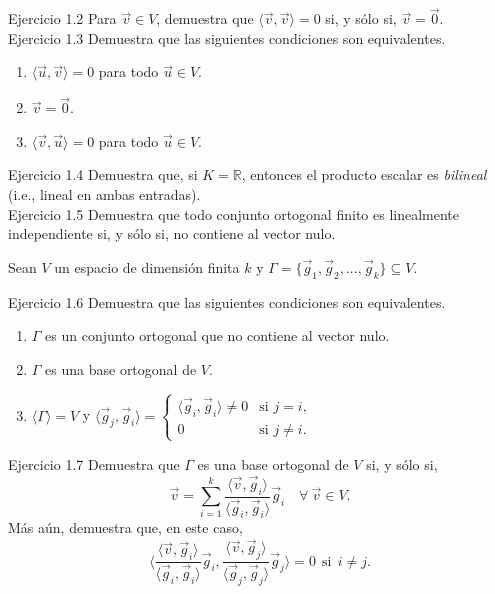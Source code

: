 \documentclass[12pt,dvipsnames]{article}
\numberwithin{equation}{section}
\begin{document}
Ejercicio 1.2 Para $\vec{v}\in V$, demuestra que $\langle \vec{v} , \vec{v} \rangle = 0$ si, y sólo si, $\vec{v}=\vec{0}$. \\

Ejercicio 1.3 Demuestra que las siguientes condiciones son equivalentes. %

\begin{enumerate}[label=(\alph*)]
    \item $\langle \vec{u} , \vec{v} \rangle = 0$ para todo $\vec{u}\in V$.

    \item $\vec{v}=\vec{0}$.

    \item $\langle \vec{v} , \vec{u} \rangle = 0$ para todo $\vec{u}\in V$.
\end{enumerate}

Ejercicio 1.4 Demuestra que, si $K=\mathbb{R}$, entonces el producto escalar es \emph{bilineal} (i.e., lineal en ambas entradas). \\

Ejercicio 1.5 Demuestra que todo conjunto ortogonal finito es linealmente independiente si, y sólo si, no contiene al vector nulo. \\

\begin{center}
Sean $V$ un espacio de dimensión finita $k$ y $\Gamma=\{\vec{g}_1,\vec{g}_2,...,\vec{g}_k\}\subseteq V$.
\end{center}

Ejercicio 1.6 Demuestra que las siguientes condiciones son equivalentes. 

\begin{enumerate}[label=(\alph*)]
    \item $\Gamma$ es un conjunto ortogonal que no contiene al vector nulo.

    \item $\Gamma$ es una base ortogonal de $V$.

    \item $\langle \Gamma \rangle = V$ y $\langle \vec{g}_j , \vec{g}_i \rangle = \begin{cases} \langle \vec{g}_i , \vec{g}_i \rangle \neq 0 &\text{si } j=i, \\ 0 &\text{si } j \neq i. \end{cases}$
\end{enumerate} 

Ejercicio 1.7 Demuestra que $\Gamma$ es una base ortogonal de $V$ si, y sólo si, 
\[
    \vec{v} = \sum_{i=1}^k \frac{\langle \vec{v} , \vec{g}_i \rangle}{\langle \vec{g}_i , \vec{g}_i \rangle} \vec{g}_i \quad \forall \ \vec{v}\in V.
\]
\noindent Más aún, demuestra que, en este caso,
\[
\bigg\langle \frac{\langle \vec{v} , \vec{g}_i \rangle}{\langle \vec{g}_i , \vec{g}_i \rangle} \vec{g}_i, \frac{\langle \vec{v} , \vec{g}_j \rangle}{\langle \vec{g}_j , \vec{g}_j \rangle} \vec{g}_j \bigg \rangle = 0 \ \ \text{si} \ \ i\neq j.
\] 
\end{document}
